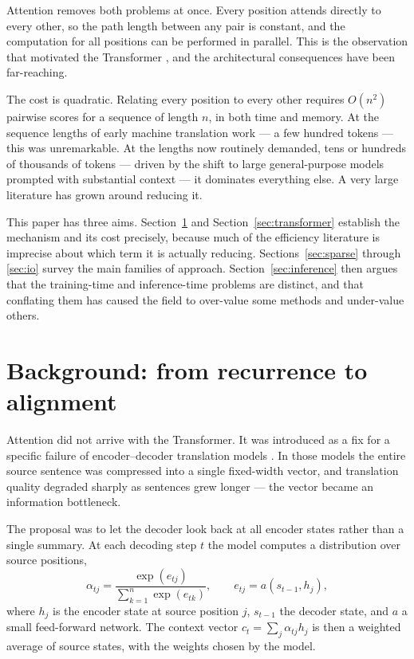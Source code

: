 \documentclass[11pt,a4paper]{article}
\begin{document}
Attention removes both problems at once. Every position attends directly to
every other, so the path length between any pair is constant, and the
computation for all positions can be performed in parallel. This is the
observation that motivated the Transformer \cite{vaswani2017}, and the
architectural consequences have been far-reaching.

The cost is quadratic. Relating every position to every other requires
$O(n^2)$ pairwise scores for a sequence of length $n$, in both time and
memory. At the sequence lengths of early machine translation work --- a few
hundred tokens --- this was unremarkable. At the lengths now routinely
demanded, tens or hundreds of thousands of tokens --- driven by the shift to
large general-purpose models prompted with substantial context
\cite{brown2020} --- it dominates everything else. A very large literature has grown around reducing it.

This paper has three aims. Section~\ref{sec:background} and
Section~\ref{sec:transformer} establish the mechanism and its cost precisely,
because much of the efficiency literature is imprecise about which term it is
actually reducing. Sections~\ref{sec:sparse} through \ref{sec:io} survey the
main families of approach. Section~\ref{sec:inference} then argues that the
training-time and inference-time problems are distinct, and that conflating
them has caused the field to over-value some methods and under-value others.

\section{Background: from recurrence to alignment}
\label{sec:background}

Attention did not arrive with the Transformer. It was introduced as a fix for
a specific failure of encoder--decoder translation models
\cite{bahdanau2015}. In those models the entire source sentence was compressed
into a single fixed-width vector, and translation quality degraded sharply as
sentences grew longer --- the vector became an information bottleneck.

The proposal was to let the decoder look back at all encoder states rather
than a single summary. At each decoding step $t$ the model computes a
distribution over source positions,
\begin{equation}
  \alpha_{tj} = \frac{\exp(e_{tj})}{\sum_{k=1}^{n} \exp(e_{tk})},
  \qquad
  e_{tj} = a(s_{t-1}, h_j),
  \label{eq:bahdanau}
\end{equation}
where $h_j$ is the encoder state at source position $j$, $s_{t-1}$ the decoder
state, and $a$ a small feed-forward network. The context vector
$c_t = \sum_j \alpha_{tj} h_j$ is then a weighted average of source states,
with the weights chosen by the model.
\end{document}

